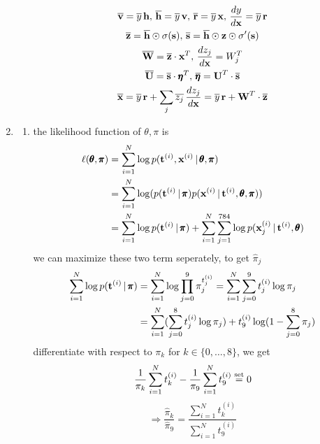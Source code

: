 \documentclass[12pt]{article}
\newcommand{\mbt}{\mb t^{(i)}}
\newcommand{\mbx}{\mb x^{(i)}}
\newcommand{\dd}[2]{\frac{d #1}{d #2}}
\begin{document}
\begin{enumerate}
\begin{enumerate}
\begin{gather*}
        \overline{\mb v} = \overline{y} \, \mb h ,\, \overline{\mb h} = \overline{y} \, \mb v,\, 
        \overline{\mb r} = \overline{y} \, \mb x,\, \dd{y}{\mb x} = \overline{y} \, \mb r \\
        \overline{\mb z} = \overline{\mb h} \odot \sigma(\mb s),\, \overline{\mb s} = \overline{\mb h} \odot \mb z \odot \sigma'(\mb s) \\
        \overline{\mb W} = \overline{\mb z} \cdot \mb x^T ,\, \dd{z_j}{\mb x} = W_j^T \\
        \overline{\mb U} = \overline{\mb s} \cdot \pmb \eta^T ,\, \overline{\pmb \eta} = \mb U^T \cdot \overline{\mb s} \\
        \overline{\mb x} = \overline{y} \, \mb r + \sum_{j} \overline{z_j} \, \dd{z_j}{\mb x} = 
        \overline{y} \, \mb r + \mb W^T \cdot \overline{\mb z}
      \end{gather*}
    \end{enumerate}
    \item \begin{enumerate}
      \item the likelihood function of $\theta, \pi$ is 
      \begin{align*}
        \ell(\pmb \theta, \pmb \pi) &= \sum_{i=1}^N \log p(\mbt, \mbx \vert 
        \pmb \theta, \pmb \pi) \\
        &= \sum_{i=1}^N \log (p(\mbt \vert \pmb \pi) p(\mbx \vert \mbt, \pmb \theta, \pmb \pi)) \\
        &= \sum_{i=1}^N \log p(\mbt \vert \pmb \pi) + 
        \sum_{i=1}^N\sum_{j=1}^{784} \log p(\mbx_j \vert \mbt, \pmb \theta) 
      \end{align*}
    we can maximize these two term seperately, to get $\hat{\pi}_j$ \\
    \begin{align*}
      \sum_{i=1}^N \log p(\mbt \vert \pmb \pi) &= \sum_{i=1}^N \log \prod_{j=0}^9 \pi_j^{t_j^{(i)}}
      = \sum_{i=1}^N \sum_{j=0}^9 t_j^{(i)}\log \pi_j \\
      &= \sum_{i=1}^N (\sum_{j=0}^8 t_j^{(i)}\log \pi_j) + t_9^{(i)} \log (1-\sum_{j=0}^8 \pi_j) 
    \end{align*}
    differentiate with respect to $\pi_k$ for $k \in \{0, \ldots, 8\}$, we get \\
    \[\frac{1}{\pi_k}\sum_{i=1}^N t_k^{(i)} - \frac{1}{\pi_9}\sum_{i=1}^N t_9^{(i)} 
    \overset{\text{{set}}}{=} 0 \]
    \[\Longrightarrow \frac{\hat{\pi}_k}{\hat{\pi}_9} = 
      \frac{\sum_{i=1}^N t_k^{(i)}}{\sum_{i=1}^N t_9^{(i)}} \]

\end{enumerate}
\end{enumerate}
\end{document}
